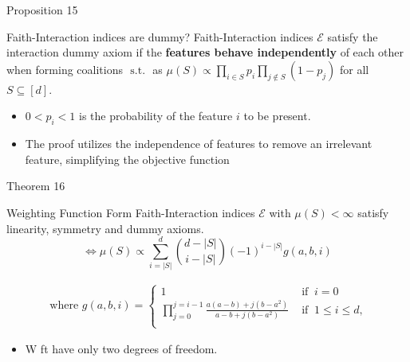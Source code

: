 \documentclass[10pt]{beamer}
\def\Expl{\mathcal{E}}
\begin{document}
\begin{frame}{Proposition 15}
    \begin{myaxiombox}{Faith-Interaction indices are dummy?}
        Faith-Interaction indices $\Expl$ satisfy the interaction dummy axiom if the \textbf{features behave independently} of each other when forming coalitions $\text{ s.t. }$ as $\mu(S) \propto \prod_{i \in S} p_i \prod_{j \not \in S} (1-p_j)$ for all $S \subseteq [d]$.
    \end{myaxiombox}
    \begin{itemize}[label=\scalebox{0.5}{$\blacksquare$}]
        \item $0 < p_i < 1$ is the probability of the feature $i$ to be present.
        \item The proof utilizes the independence of features to remove an irrelevant feature, simplifying the objective function
    \end{itemize}
\end{frame}
\begin{frame}{Theorem 16}
    \begin{mytheorembox}{Weighting Function Form}
        Faith-Interaction indices $\Expl$ with $\mu(S) < \infty$ satisfy linearity, symmetry and dummy axioms.
        \vspace{1em}
        \[ \iff
        \mu(S) \propto \sum_{i=|S|}^{d} \binom{d- |S|}{i-|S|}(-1)^{i-|S|} g(a,b,i) 
        \]

    \end{mytheorembox}
    \begin{align*}
        \text{ where }
        g(a,b,i) =
        \begin{cases}
            1 & \text{ if } \ i = 0 \\
            \prod_{j=0}^{j=i-1} \frac{a(a-b) + j(b-a^2)}{a-b + j(b-a^2)}
            & \text{ if } \   1 \leq i \leq d,\\
        \end{cases}
    \end{align*}
    \begin{itemize}[label=\scalebox{0.5}{$\blacksquare$}]
        \item W ft have only two degrees of freedom.
    \end{itemize}
\end{frame}
\end{document}
